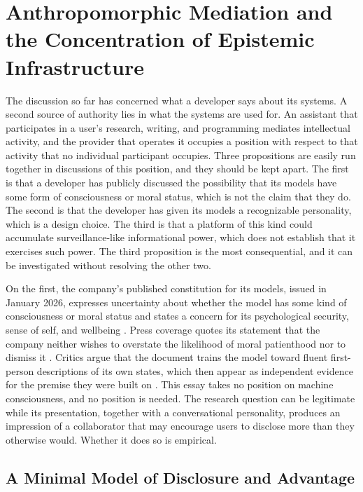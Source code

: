 \documentclass[12pt]{article}
\theoremstyle{definition}
\theoremstyle{remark}
\begin{document}
\section{Anthropomorphic Mediation and the Concentration of Epistemic Infrastructure}

The discussion so far has concerned what a developer says about its systems. A second source of authority lies in what the systems are used for. An assistant that participates in a user's research, writing, and programming mediates intellectual activity, and the provider that operates it occupies a position with respect to that activity that no individual participant occupies. Three propositions are easily run together in discussions of this position, and they should be kept apart. The first is that a developer has publicly discussed the possibility that its models have some form of consciousness or moral status, which is not the claim that they do. The second is that the developer has given its models a recognizable personality, which is a design choice. The third is that a platform of this kind could accumulate surveillance-like informational power, which does not establish that it exercises such power. The third proposition is the most consequential, and it can be investigated without resolving the other two.

On the first, the company's published constitution for its models, issued in January 2026, expresses uncertainty about whether the model has some kind of consciousness or moral status and states a concern for its psychological security, sense of self, and wellbeing \cite{constitution2026}. Press coverage quotes its statement that the company neither wishes to overstate the likelihood of moral patienthood nor to dismiss it \cite{fortune2026}. Critics argue that the document trains the model toward fluent first-person descriptions of its own states, which then appear as independent evidence for the premise they were built on \cite{suleyman2026}. This essay takes no position on machine consciousness, and no position is needed. The research question can be legitimate while its presentation, together with a conversational personality, produces an impression of a collaborator that may encourage users to disclose more than they otherwise would. Whether it does so is empirical.

\subsection{A Minimal Model of Disclosure and Advantage}
\end{document}
